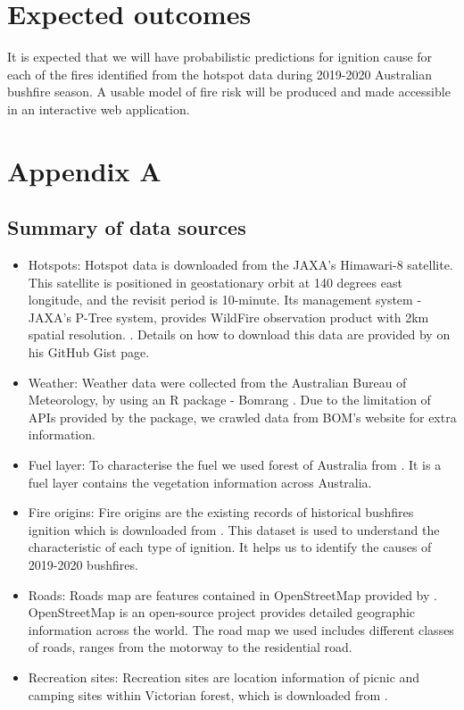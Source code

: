 \documentclass[11pt,a4paper,]{article}
\begin{document}
\hypertarget{expected-outcomes}{%
\section{Expected outcomes}\label{expected-outcomes}}

It is expected that we will have probabilistic predictions for ignition cause for each of the fires identified from the hotspot data during 2019-2020 Australian bushfire season. A usable model of fire risk will be produced and made accessible in an interactive web application.

\newpage

\hypertarget{appendix-a}{%
\section*{Appendix A}\label{appendix-a}}

\hypertarget{summary-of-data-sources}{%
\subsection{Summary of data sources}\label{summary-of-data-sources}}

\begin{itemize}
\item
  Hotspots: Hotspot data is downloaded from the JAXA's Himawari-8 satellite. This satellite is positioned in geostationary orbit at 140 degrees east longitude, and the revisit period is 10-minute. Its management system - JAXA's P-Tree system, provides WildFire observation product with 2km spatial resolution. \autocite{jaxa}. Details on how to download this data are provided by \textcite{hotspots} on his GitHub Gist page.
\item
  Weather: Weather data were collected from the Australian Bureau of Meteorology, by using an R package - Bomrang \autocite{R-bomrang}. Due to the limitation of APIs provided by the package, we crawled data from BOM's website for extra information.
\item
  Fuel layer: To characterise the fuel we used forest of Australia from \textcite{forest}. It is a fuel layer contains the vegetation information across Australia.
\item
  Fire origins: Fire origins are the existing records of historical bushfires ignition which is downloaded from \textcite{fireorigin}. This dataset is used to understand the characteristic of each type of ignition. It helps us to identify the causes of 2019-2020 bushfires.
\item
  Roads: Roads map are features contained in OpenStreetMap provided by \textcite{OpenStreetMap}. OpenStreetMap is an open-source project provides detailed geographic information across the world. The road map we used includes different classes of roads, ranges from the motorway to the residential road.
\item
  Recreation sites: Recreation sites are location information of picnic and camping sites within Victorian forest, which is downloaded from \textcite{recreation}.
\end{itemize}
\end{document}
